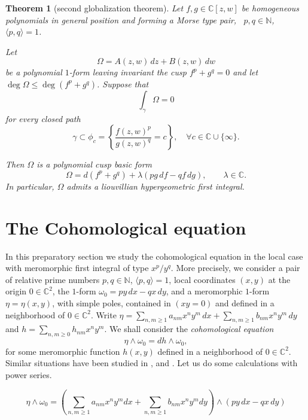 \documentclass[11pt,a4paper]{amsart}
\newtheorem{theorem}{Theorem}[section]
\theoremstyle{definition}
\begin{document}
\begin{theorem}[second globalization theorem]
\label{theorem:secondglobalizationcusp}
Let $f,g\in\mathbb{C}[z,w]$ be homogeneous
polynomials in general position and forming a Morse type pair, \, 
$p,q\in\mathbb{N}$, $\langle p,q\rangle=1$.

Let
\[
\Omega = A(z,w)\,dz + B(z,w)\,dw
\]
be a polynomial $1$-form leaving invariant  the  cusp 
$f^p + g^q=0$ and let $\deg \Omega \leq \deg (f^p + g^q)$. 
Suppose that
\[
\int_\gamma \Omega = 0
\]
for every closed path
\[
\gamma \subset
\phi_c
=
\left\{
\frac{f(z,w)^p}{g(z,w)^q}=c
\right\},
\quad
\forall c\in\mathbb{C}\cup\{\infty\}.
\]

Then $\Omega$ is a polynomial cusp basic form 
\[
\Omega
=
d(f^p + g^q)
+
\lambda(p g\,df - q f\,dg),
\qquad
\lambda \in\mathbb C.
\]
In particular, $\Omega$ admits a liouvillian hypergeometric  first integral. 

\end{theorem}








\section{The Cohomological equation}
\label{section:cohomoeq}
In this preparatory section we study the cohomological equation in the local case with meromorphic first integral of type $x^p/y^q$. More precisely,  we consider a pair of relative prime numbers $p,q\in\mathbb N$, $\langle p,q\rangle=1$, local coordinates $(x,y)$ at the origin $0\in\mathbb C^2$,
 the $1$-form $\omega_0 = p y\,dx - q x\,dy$,
and   a meromorphic $1$-form $\eta=\eta(x,y)$, with simple poles, contained in $(xy=0)$ and defined in a neighborhood of $0\in\mathbb C^2$.
Write $\eta
=
\sum_{n,m\ge1} a_{nm} x^n y^m \, dx
+
\sum_{n,m\ge1} b_{nm} x^n y^m \, dy
$
and
$
h
=
\sum_{n,m\ge0} h_{nm} x^n y^m.
$
We shall consider the {\it cohomological equation} 
\begin{equation}
\label{equation:cohomological}
\eta\wedge\omega_0 = dh\wedge\omega_0,
\end{equation}
for some meromorphic function $h(x,y)$ defined in a neighborhood of $0\in\mathbb C^2$. Similar situations have been studied in \cite{[Cerveau--Berthier]}, \cite{ScarduaIJM} and \cite{LeonScarduaJS}. 
Let us do some calculations with power series.

\[
\eta \wedge \omega_0
=
\left(
\sum_{n,m\ge1} a_{nm} x^n y^m dx
+
\sum_{n,m\ge1} b_{nm} x^n y^m dy
\right)
\wedge
(py\,dx - qx\,dy)
\]
\end{document}
